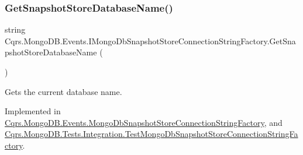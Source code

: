 \mbox{\label{interfaceCqrs_1_1MongoDB_1_1Events_1_1IMongoDbSnapshotStoreConnectionStringFactory_ab04ecd4d9529dca4ea648d38cb5d4b78_ab04ecd4d9529dca4ea648d38cb5d4b78}} 
\subsubsection{\texorpdfstring{Get\+Snapshot\+Store\+Database\+Name()}{GetSnapshotStoreDatabaseName()}}
{\footnotesize\ttfamily string Cqrs.\+Mongo\+D\+B.\+Events.\+I\+Mongo\+Db\+Snapshot\+Store\+Connection\+String\+Factory.\+Get\+Snapshot\+Store\+Database\+Name (\begin{DoxyParamCaption}{ }\end{DoxyParamCaption})}



Gets the current database name. 



Implemented in \hyperlink{classCqrs_1_1MongoDB_1_1Events_1_1MongoDbSnapshotStoreConnectionStringFactory_ac7887125d11922bce590cc541fc84e62_ac7887125d11922bce590cc541fc84e62}{Cqrs.\+Mongo\+D\+B.\+Events.\+Mongo\+Db\+Snapshot\+Store\+Connection\+String\+Factory}, and \hyperlink{classCqrs_1_1MongoDB_1_1Tests_1_1Integration_1_1TestMongoDbSnapshotStoreConnectionStringFactory_aec64598d970898309a086123b7867ab3_aec64598d970898309a086123b7867ab3}{Cqrs.\+Mongo\+D\+B.\+Tests.\+Integration.\+Test\+Mongo\+Db\+Snapshot\+Store\+Connection\+String\+Factory}.

